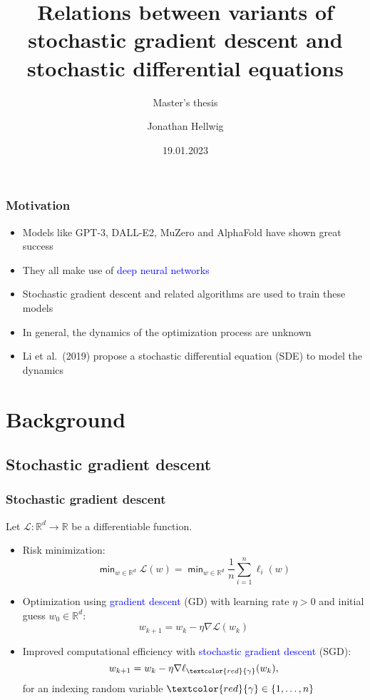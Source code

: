\documentclass[aspectratio=1610,10pt,ucs]{beamer} %
\title{Relations between variants of
stochastic gradient descent and
stochastic differential equations}
\subtitle{Master's thesis}
\author[Jonathan Hellwig]{%
  Jonathan Hellwig}
\date{19.01.2023}
\newcommand{\R}{\mathbb{R}}
\renewcommand{\min}{\mathop{\mathsf{min}}}
\begin{document}
\begin{frame}
  \titlepage
\end{frame}
\begin{frame}
  \frametitle{Motivation}



  \begin{itemize}
  \item Models like GPT-3, DALL-E2, MuZero and AlphaFold have shown great success
  \item They all make use of \textcolor{blue}{deep neural networks}
  \item Stochastic gradient descent and related algorithms are used to train these models
  \item In general, the dynamics of the optimization process are unknown
  \item Li et al.\ (2019) propose a stochastic differential equation (SDE) to model the dynamics
  \end{itemize}

\end{frame}
\section{Background}
\subsection{Stochastic gradient descent}
\begin{frame}
\frametitle{Stochastic gradient descent}
Let $\mathcal{L}:\R^d\rightarrow \R$ be a differentiable function.
\begin{itemize}
 \item Risk minimization: $$\min_{w \in \R^d} \mathcal{L}(w) = \min_{w \in \R^d}\frac{1}{n}\sum_{i=1}^n \ell_i(w)$$
 \item Optimization using \textcolor{blue}{gradient descent} (GD) with learning rate $\eta > 0$ and initial guess $w_0 \in \R^d$:
 \begin{equation*}
  w_{k+1} = w_k - \eta \nabla \mathcal{L}(w_k)
 \end{equation*}
 \item Improved computational efficiency with \textcolor{blue}{stochastic gradient descent} (SGD):
 \begin{equation*}
  w_{k+1} = w_k - \eta \nabla \ell_{\textcolor{red}{\gamma}}(w_k),
 \end{equation*}
 for an indexing random variable $\textcolor{red}{\gamma} \in \{1,\dots, n\}$
\end{itemize}
\end{frame}
\end{document}
